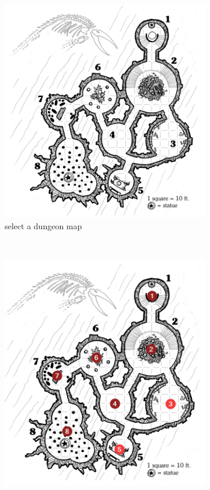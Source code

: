 \documentclass{UoYCSproject}
\begin{document}
\begin{figure}[htb]
  \centering
  \begin{subfigure}[b]{0.33\textwidth}
    \centering
    \includegraphics[width=\textwidth]{figures/step1.png}
    \caption{select a dungeon map}
  \end{subfigure}
  ~
  \begin{subfigure}[b]{0.33\textwidth}
    \centering
    \includegraphics[width=\textwidth]{figures/step2.png}

\end{subfigure}
\end{figure}
\end{document}
